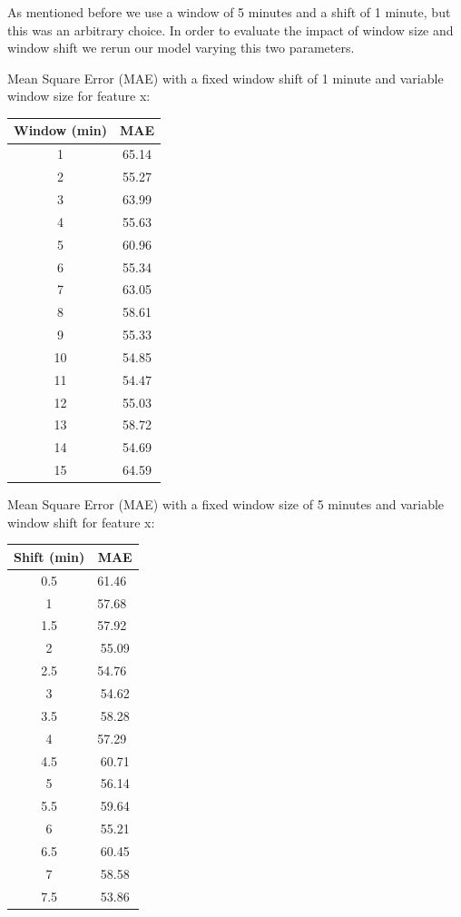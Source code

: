 As mentioned before we use a window of 5 minutes and a shift of 1 minute, but this was an arbitrary choice. In order to evaluate the impact of window size and window shift we rerun our model varying this two parameters.

Mean Square Error (MAE) with a fixed window shift of 1 minute and variable window size for feature x:

\begin{center}
\begin{tabular}{| c | c |} 
\hline
Window (min) & MAE  \\ [0.5ex] 
\hline
\hline
 1 & 65.14 \\
 \hline
 2 & 55.27 \\
 \hline
 3 & 63.99 \\
 \hline
 4 & 55.63 \\
 \hline
 5 & 60.96 \\
 \hline
 6 & 55.34 \\
 \hline
 7 & 63.05 \\
 \hline
 8 & 58.61 \\
 \hline
 9 & 55.33 \\
 \hline
 10 & 54.85 \\
 \hline
 11 & 54.47 \\
 \hline
 12 & 55.03 \\
 \hline
 13 & 58.72 \\
 \hline
 14 & 54.69 \\
 \hline
 15 & 64.59 \\
\hline
\end{tabular}
\end{center}

Mean Square Error (MAE) with a fixed window size of 5 minutes and variable window shift for feature x: 

\begin{center}
\begin{tabular}{| c | c |} 
\hline
Shift (min) & MAE  \\ [0.5ex] 
\hline
\hline
0.5 & 61.46\ \\
\hline
1 & 57.68\ \\
\hline 
1.5 & 57.92\ \\
\hline 
2 & 55.09 \\
\hline 
2.5 & 54.76\ \\
\hline 
3 & 54.62 \\
\hline 
3.5 & 58.28 \\
\hline 
4 & 57.29\ \\
\hline 
4.5 & 60.71 \\
\hline 
5 & 56.14 \\
\hline
5.5 & 59.64 \\
\hline 
6 & 55.21 \\
\hline
6.5 & 60.45 \\
\hline
7 & 58.58 \\
\hline 
7.5 & 53.86 \\
\hline
\end{tabular}
\end{center}

